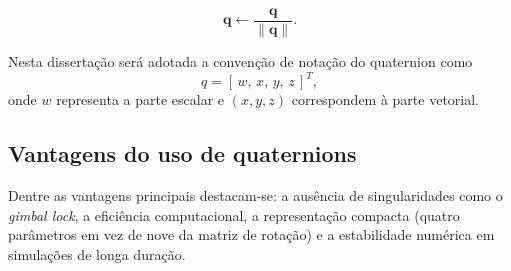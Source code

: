\begin{equation}
    \mathbf{q} \leftarrow \frac{\mathbf{q}}{\lVert \mathbf{q} \rVert}.
\end{equation}

Nesta dissertação será adotada a convenção de notação do quaternion como
\begin{equation}
q = [\,w,\,x,\,y,\,z\,]^T,
\label{eq:quat_convencao}
\end{equation}
onde $w$ representa a parte escalar e $(x,y,z)$ correspondem à parte vetorial.

\subsection{Vantagens do uso de quaternions}
Dentre as vantagens principais destacam-se: a ausência de singularidades como o \emph{gimbal lock}, a eficiência computacional, a representação compacta (quatro parâmetros em vez de nove da matriz de rotação) e a estabilidade numérica em simulações de longa duração.
